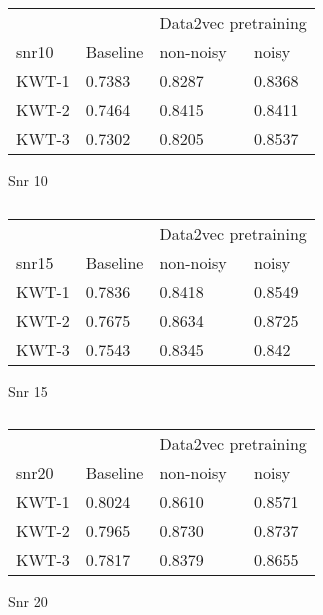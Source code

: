 \begin{table}[ht]
    \begin{subtable}[ht]{0.45\textwidth}
        \centering
        \begin{tabular}{@{}llll@{}}
        \toprule
        & & \multicolumn{2}{c}{Data2vec pretraining} \\ \cline{3-4}
        snr10    & Baseline & non-noisy & noisy \\ \midrule
        KWT-1    & 0.7383  & 0.8287 & 0.8368 \\
        KWT-2    & 0.7464  & 0.8415 & 0.8411 \\
        KWT-3    & 0.7302  & 0.8205 & 0.8537 \\
        \bottomrule
        \end{tabular}
        \caption{Snr 10}
    \end{subtable}
    \hfill
    \begin{subtable}[ht]{0.45\textwidth}
        \centering
        \begin{tabular}{@{}llll@{}}
        \toprule
        & & \multicolumn{2}{c}{Data2vec pretraining} \\ \cline{3-4}
        snr15    & Baseline & non-noisy & noisy \\ \midrule
        KWT-1    & 0.7836  & 0.8418 & 0.8549 \\
        KWT-2    & 0.7675  & 0.8634 & 0.8725 \\
        KWT-3    & 0.7543  & 0.8345 & 0.842 \\
        \bottomrule
        \end{tabular}
        \caption{Snr 15}
    \end{subtable}

    
    \bigskip


    \begin{subtable}[ht]{0.45\textwidth}
        \centering
        \begin{tabular}{@{}llll@{}}
        \toprule
        & & \multicolumn{2}{c}{Data2vec pretraining} \\ \cline{3-4}
        snr20    & Baseline & non-noisy & noisy \\ \midrule
        KWT-1    & 0.8024  & 0.8610 & 0.8571 \\
        KWT-2    & 0.7965  & 0.8730 & 0.8737 \\
        KWT-3    & 0.7817  & 0.8379 & 0.8655 \\
        \bottomrule
        \end{tabular}
        \caption{Snr 20}
    \end{subtable}
    \caption{}
    \label{tab:test_noise}
\end{table}


